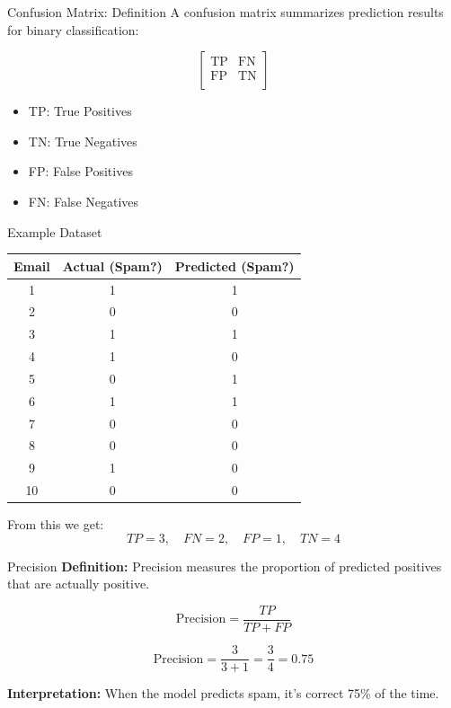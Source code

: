 \documentclass{beamer}
\begin{document}

\begin{frame}{Confusion Matrix: Definition}
A confusion matrix summarizes prediction results for binary classification:

\[
\begin{bmatrix}
\text{TP} & \text{FN} \\
\text{FP} & \text{TN} \\
\end{bmatrix}
\]

\begin{itemize}
  \item TP: True Positives
  \item TN: True Negatives
  \item FP: False Positives
  \item FN: False Negatives
\end{itemize}
\end{frame}

\begin{frame}{Example Dataset}
\begin{tabular}{|c|c|c|}
\hline
\textbf{Email} & \textbf{Actual (Spam?)} & \textbf{Predicted (Spam?)} \\
\hline
1 & 1 & 1 \\
2 & 0 & 0 \\
3 & 1 & 1 \\
4 & 1 & 0 \\
5 & 0 & 1 \\
6 & 1 & 1 \\
7 & 0 & 0 \\
8 & 0 & 0 \\
9 & 1 & 0 \\
10 & 0 & 0 \\
\hline
\end{tabular}

\vspace{0.3cm}
From this we get:
\[
TP = 3,\quad FN = 2,\quad FP = 1,\quad TN = 4
\]
\end{frame}

\begin{frame}{Precision}
\textbf{Definition:} Precision measures the proportion of predicted positives that are actually positive.

\[
\text{Precision} = \frac{TP}{TP + FP}
\]

\[
\text{Precision} = \frac{3}{3 + 1} = \frac{3}{4} = 0.75
\]

\textbf{Interpretation:} When the model predicts spam, it's correct 75\% of the time.
\end{frame}
\end{document}
